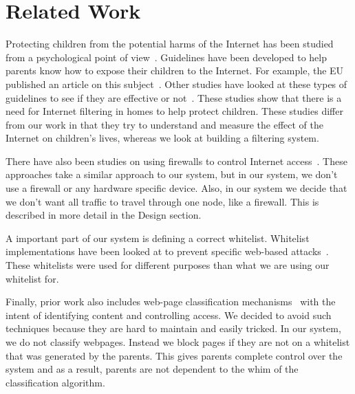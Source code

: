 
\section{Related Work}

Protecting children from the potential harms of the Internet has been studied
from a psychological point of view~\cite{ybarra2005exposure, ho_statistical}.
Guidelines have been developed to help parents know how to expose their
children to the Internet. For example, the EU published an article on this
subject~\cite{holloway2013zero, livingstone2010risks}. Other studies have
looked at these types of guidelines to see if they are effective or
not~\cite{livingstone2008parental}. These studies show that there is a need for
Internet filtering in homes to help protect children. These studies differ from
our work in that they try to understand and measure the effect of the Internet
on children's lives, whereas we look at building a filtering system.

There have also been studies on using firewalls to control Internet
access~\cite{ivanovic, nguyen}. These approaches take a similar approach to
our system, but in our system, we don't use a firewall or any hardware specific
device. Also, in our system we decide that we don't want all traffic to travel
through one node, like a firewall. This is described in more detail in the
Design section.

A important part of our system is defining a correct whitelist. Whitelist
implementations have been looked at to prevent specific web-based
attacks~\cite{han_automated_whitelist, iha_implementation}. These whitelists
were used for different purposes than what we are using our whitelist for.

Finally, prior work also includes web-page classification
mechanisms~\cite{baykan_et_al_url_based_classification,
chen_et_al_novel_web_page_filtering, ho_statistical} with the intent of
identifying content and controlling access. We decided to avoid such techniques
because they are hard to maintain and easily tricked. In our system, we do not
classify webpages. Instead we block pages if they are not on a whitelist that
was generated by the parents.  This gives parents complete control over the
system and as a result, parents are not dependent to the whim of the
classification algorithm.
